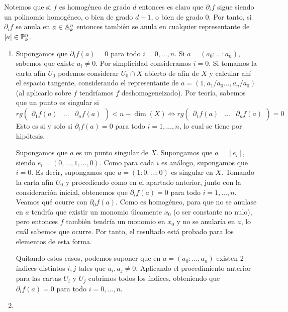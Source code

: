 \documentclass[twoside]{article}
\begin{document}
\begin{solucion}
Notemos que si $f$ es homogéneo de grado $d$ entonces es claro que $\partial_i f$ sigue siendo un polinomio homogéneo, o bien de grado $d-1$, o bien de grado $0$. Por tanto, si $\partial_i f$ se anula en $a\in \mathbb{A}^n_k$ entonces también se anula en cualquier representante de $[a]\in \mathbb{P}^n_k$. 
\begin{enumerate}
\item Supongamos que $\partial_i f(a)=0$ para todo $i=0,\dotsc,n$. Si $a=(a_0:\dotsc:a_n)$, sabemos que existe $a_i \neq 0$. Por simplicidad consideramos $i=0$. Si tomamos la carta afín $U_0$ podemos considerar $U_0 \cap X$ abierto de afín de $X$ y calcular ahí el espacio tangente, considerando el representante de $a=(1,a_1/a_0 \dotsc, a_n/a_0)$ (al aplicarlo sobre $f$ tendríamos $f$ deshomogeneizado). Por teoría, sabemos que un punto es singular si 
$$
rg
\begin{pmatrix}
\partial_1 f(a) & \dotsc & \partial_n f(a)
\end{pmatrix} < n-\dim(X) \Leftrightarrow 
rg
\begin{pmatrix}
\partial_1 f(a) & \dotsc & \partial_n f(a)
\end{pmatrix} = 0
$$
Esto es si y solo si $\partial_i f(a) = 0$ para todo $i=1,\dotsc,n$, lo cual se tiene por hipótesis.

Supongamos que $a$ es un punto singular de $X$. Supongamos que $a=[e_i]$, siendo $e_i = (0,\dotsc,1,\dotsc,0)$. Como para cada $i$ es análogo, supongamos que $i=0$. Es decir, supongamos que $a=(1:0:\dotsc:0)$ es singular en $X$. Tomando la carta afín $U_0$ y procediendo como en el apartado anterior, junto con la consideración inicial, obtenemos que $\partial_i f(a) = 0$ para todo $i=1,\dotsc,n$. Veamos qué ocurre con $\partial_0 f(a)$. Como es homogéneo, para que no se anulase en $a$ tendría que existir un monomio úicamente $x_0$ (o ser constante no nulo), pero entonces $f$ también tendría un monomio en $x_0$ y no se anularía en $a$, lo cuál sabemos que ocurre. Por tanto, el resultado está probado para los elementos de esta forma.

Quitando estos casos, podemos suponer que en $a=(a_0:\dotsc,a_n)$ existen 2 índices distintos $i,j$ tales que $a_i,a_j \neq 0$. Aplicando el procedimiento anterior para las cartas $U_i$ y $U_j$ cubrimos todos los índices, obteniendo que $\partial_i f(a)=0$ para todo $i=0,\dotsc,n$.
\item 
\end{enumerate}
\end{solucion}
\end{document}
